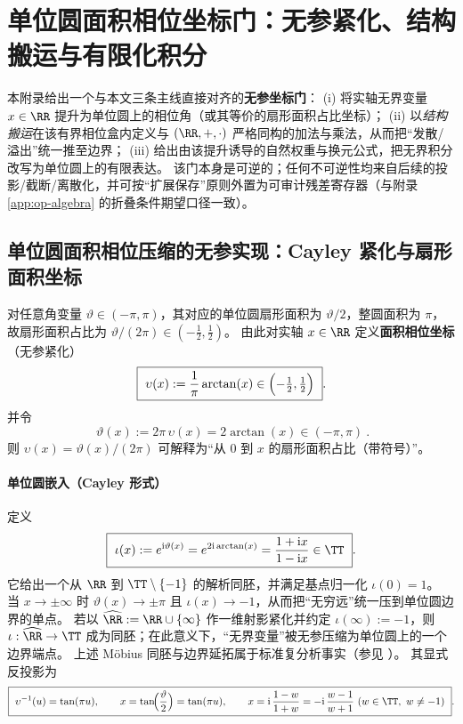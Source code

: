 \section{单位圆面积相位坐标门：无参紧化、结构搬运与有限化积分}\label{app:unit-circle-phase-gate}
本附录给出一个与本文三条主线直接对齐的\textbf{无参坐标门}：
(i) 将实轴无界变量 \(x\in\RR\) 提升为单位圆上的相位角（或其等价的扇形面积占比坐标）；
(ii) 以\emph{结构搬运}在该有界相位盒内定义与 \((\RR,+,\cdot)\) 严格同构的加法与乘法，从而把“发散/溢出”统一推至边界；
(iii) 给出由该提升诱导的自然权重与换元公式，把无界积分改写为单位圆上的有限表达。
该门本身是可逆的；任何不可逆性均来自后续的投影/截断/离散化，并可按“扩展保存”原则外置为可审计残差寄存器（与附录 \ref{app:op-algebra} 的折叠条件期望口径一致）。

\subsection{单位圆面积相位压缩的无参实现：Cayley 紧化与扇形面积坐标}\label{subsec:unit-circle-phase-lift}
对任意角变量 \(\vartheta\in(-\pi,\pi)\)，其对应的单位圆扇形面积为 \(\vartheta/2\)，整圆面积为 \(\pi\)，故扇形面积占比为 \(\vartheta/(2\pi)\in(-\tfrac12,\tfrac12)\)。
由此对实轴 \(x\in\RR\) 定义\textbf{面积相位坐标}（无参紧化）
\begin{equation}\label{eq:unit-circle-phase-upsilon}
\boxed{\ \upsilon(x):=\frac{1}{\pi}\arctan(x)\in\Bigl(-\tfrac12,\tfrac12\Bigr)\ }.
\end{equation}
并令
\begin{equation}\label{eq:unit-circle-phase-vartheta}
\boxed{\ \vartheta(x):=2\pi\,\upsilon(x)=2\arctan(x)\in(-\pi,\pi)\ }.
\end{equation}
则 \(\upsilon(x)=\vartheta(x)/(2\pi)\) 可解释为“从 \(0\) 到 \(x\) 的扇形面积占比（带符号）”。

\paragraph{单位圆嵌入（Cayley 形式）}
定义
\begin{equation}\label{eq:unit-circle-cayley-embed}
\boxed{\ \iota(x):=e^{\mathrm{i}\vartheta(x)}=e^{2\mathrm{i}\arctan(x)}=\frac{1+\mathrm{i}x}{1-\mathrm{i}x}\in\TT\ }.
\end{equation}
它给出一个从 \(\RR\) 到 \(\TT\setminus\{-1\}\) 的解析同胚，并满足基点归一化 \(\iota(0)=1\)。
当 \(x\to\pm\infty\) 时 \(\vartheta(x)\to\pm\pi\) 且 \(\iota(x)\to-1\)，从而把“无穷远”统一压到单位圆边界的单点。
若以 \(\widehat{\RR}:=\RR\cup\{\infty\}\) 作一维射影紧化并约定 \(\iota(\infty):=-1\)，则 \(\iota:\widehat{\RR}\to\TT\) 成为同胚；在此意义下，“无界变量”被无参压缩为单位圆上的一个边界端点。
上述 Möbius 同胚与边界延拓属于标准复分析事实（参见 \cite{Ahlfors1979ComplexAnalysis}）。
其显式反投影为
\begin{equation}\label{eq:unit-circle-phase-inverse}
\boxed{\ \upsilon^{-1}(u)=\tan(\pi u),\qquad x=\tan\!\Bigl(\frac{\vartheta}{2}\Bigr)=\tan(\pi u),\qquad
x=\mathrm{i}\,\frac{1-w}{1+w}=-\mathrm{i}\,\frac{w-1}{w+1}\ (w\in\TT,\ w\neq-1)\ }.
\end{equation}

